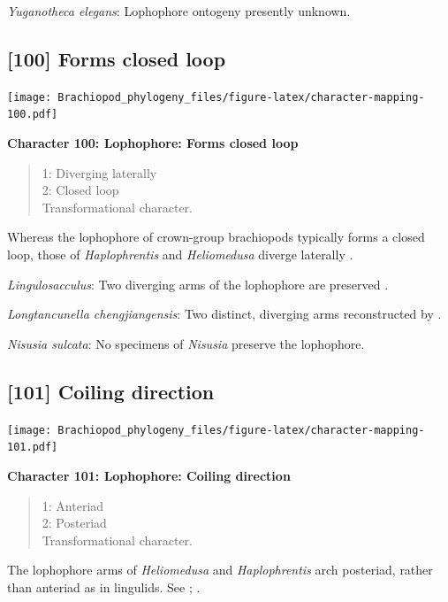 \documentclass[]{book}
\theoremstyle{definition}
\theoremstyle{definition}
\theoremstyle{definition}
\theoremstyle{remark}
\begin{document}
\emph{Yuganotheca elegans}: Lophophore ontogeny presently unknown.

\hypertarget{forms-closed-loop}{%
\subsection*{{[}100{]} Forms closed loop}\label{forms-closed-loop}}

\texttt{[image: Brachiopod\_phylogeny\_files/figure-latex/character-mapping-100.pdf]}

\textbf{Character 100: Lophophore: Forms closed loop}

\begin{quote}
1: Diverging laterally\\
2: Closed loop\\
Transformational character.
\end{quote}

Whereas the lophophore of crown-group brachiopods typically forms a
closed loop, those of \emph{Haplophrentis} and \emph{Heliomedusa}
diverge laterally \citep{Moysiuk2017Hyolithsare}.

\emph{Lingulosacculus}: Two diverging arms of the lophophore are
preserved \citep{Balthasar2009EarlyCambrian}.

\emph{Longtancunella chengjiangensis}: Two distinct, diverging arms
reconstructed by \citet{Zhang2007Agregarious}.

\emph{Nisusia sulcata}: No specimens of \emph{Nisusia} preserve the
lophophore.

\hypertarget{coiling-direction}{%
\subsection*{{[}101{]} Coiling direction}\label{coiling-direction}}

\texttt{[image: Brachiopod\_phylogeny\_files/figure-latex/character-mapping-101.pdf]}

\textbf{Character 101: Lophophore: Coiling direction}

\begin{quote}
1: Anteriad\\
2: Posteriad\\
Transformational character.
\end{quote}

The lophophore arms of \emph{Heliomedusa} and \emph{Haplophrentis} arch
posteriad, rather than anteriad as in lingulids. See
\citet{Zhang2009Architectureand}; \citet{Moysiuk2017Hyolithsare}.
\end{document}
